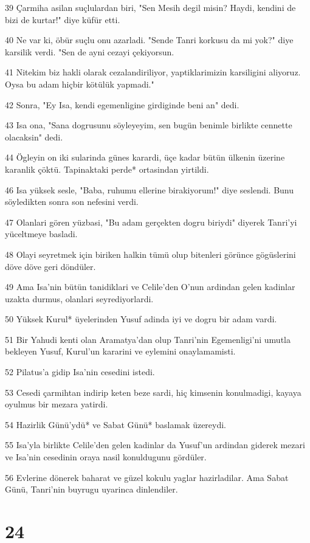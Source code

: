\par 39 Çarmiha asilan suçlulardan biri, "Sen Mesih degil misin? Haydi, kendini de bizi de kurtar!" diye küfür etti.
\par 40 Ne var ki, öbür suçlu onu azarladi. "Sende Tanri korkusu da mi yok?" diye karsilik verdi. "Sen de ayni cezayi çekiyorsun.
\par 41 Nitekim biz hakli olarak cezalandiriliyor, yaptiklarimizin karsiligini aliyoruz. Oysa bu adam hiçbir kötülük yapmadi."
\par 42 Sonra, "Ey Isa, kendi egemenligine girdiginde beni an" dedi.
\par 43 Isa ona, "Sana dogrusunu söyleyeyim, sen bugün benimle birlikte cennette olacaksin" dedi.
\par 44 Ögleyin on iki sularinda günes karardi, üçe kadar bütün ülkenin üzerine karanlik çöktü. Tapinaktaki perde* ortasindan yirtildi.
\par 46 Isa yüksek sesle, "Baba, ruhumu ellerine birakiyorum!" diye seslendi. Bunu söyledikten sonra son nefesini verdi.
\par 47 Olanlari gören yüzbasi, "Bu adam gerçekten dogru biriydi" diyerek Tanri'yi yüceltmeye basladi.
\par 48 Olayi seyretmek için biriken halkin tümü olup bitenleri görünce gögüslerini döve döve geri döndüler.
\par 49 Ama Isa'nin bütün tanidiklari ve Celile'den O'nun ardindan gelen kadinlar uzakta durmus, olanlari seyrediyorlardi.
\par 50 Yüksek Kurul* üyelerinden Yusuf adinda iyi ve dogru bir adam vardi.
\par 51 Bir Yahudi kenti olan Aramatya'dan olup Tanri'nin Egemenligi'ni umutla bekleyen Yusuf, Kurul'un kararini ve eylemini onaylamamisti.
\par 52 Pilatus'a gidip Isa'nin cesedini istedi.
\par 53 Cesedi çarmihtan indirip keten beze sardi, hiç kimsenin konulmadigi, kayaya oyulmus bir mezara yatirdi.
\par 54 Hazirlik Günü'ydü* ve Sabat Günü* baslamak üzereydi.
\par 55 Isa'yla birlikte Celile'den gelen kadinlar da Yusuf'un ardindan giderek mezari ve Isa'nin cesedinin oraya nasil konuldugunu gördüler.
\par 56 Evlerine dönerek baharat ve güzel kokulu yaglar hazirladilar. Ama Sabat Günü, Tanri'nin buyrugu uyarinca dinlendiler.

\chapter{24}

